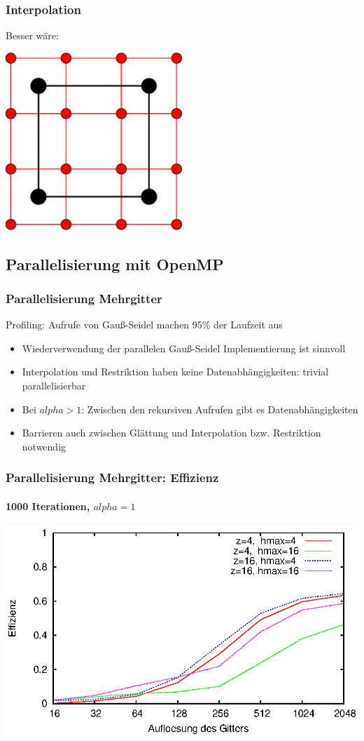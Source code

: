 \documentclass{beamer}
\begin{document}
\begin{frame}
    \frametitle{Interpolation}
    Besser wäre:
    \begin{center}
        \includegraphics[width=0.5\textwidth]{interpolation2}
    \end{center}
\end{frame}

\subsection{Parallelisierung mit OpenMP}
\begin{frame}
    \frametitle{Parallelisierung Mehrgitter}
    Profiling: Aufrufe von Gauß-Seidel machen 95\% der Laufzeit aus
    \begin{itemize}
        \item Wiederverwendung der parallelen Gauß-Seidel Implementierung ist sinnvoll
        \item Interpolation und Restriktion haben keine Datenabhängigkeiten: trivial parallelisierbar
        \item Bei $alpha > 1$: Zwischen den rekursiven Aufrufen gibt es Datenabhängigkeiten
        \item Barrieren auch zwischen Glättung und Interpolation bzw. Restriktion notwendig
    \end{itemize}
\end{frame}

\begin{frame}
    \frametitle{Parallelisierung Mehrgitter: Effizienz}
    \framesubtitle{1000 Iterationen, $alpha=1$}
    \includegraphics[width=\textwidth]{plots/effizienzmehrgitter}
\end{frame}
\end{document}
